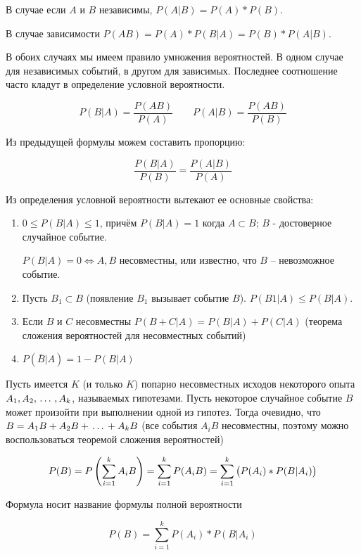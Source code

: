 ﻿\documentclass[a4paper,12pt]{report}
\begin{document}
	В случае если $A$ и $B$ независимы, $P(A|B) = P(A)*P(B)$. 

	В случае зависимости $P(AB) = P(A)*P(B|A) = P(B)*P(A|B)$. 

	В обоих случаях мы имеем правило умножения вероятностей. В одном случае для независимых событий, в другом для зависимых. Последнее соотношение часто кладут в определение условной вероятности. 

	$$
	  P(B|A) = \frac{P(AB)}{P(A)} \qquad 
	  P(A|B) = \frac{P(AB)}{P(B)}
	$$

	Из предыдущей формулы можем составить пропорцию: 
	
	$$
	  \frac{P(B|A)}{P(B)} = \frac{P(A|B)}{P(A)}
	$$

	Из определения условной вероятности вытекают ее основные свойства:


	\begin{enumerate}

	\item	$0 \leqslant P(B|A) \leqslant 1$, причём $P(B|A) = 1$ когда $A \subset B$; $B$ - достоверное случайное событие.

		$P(B|A) = 0 \Longleftrightarrow A, B$ несовместны, или известно, что $B$ – невозможное событие.

	
	\item	Пусть $B_1 \subset B$ (появление $B_1$ вызывает событие $B$). \; $P(B1|A) \leqslant P(B|A)$.


	\item	Если $B$ и $C$ несовместны $P(B+C|A) = P(B|A) + P(C|A)$ (теорема сложения вероятностей для несовместных событий)


	\item	$P(\bar B|A) =  1 - P(B|A)$

	\end{enumerate}


	 Пусть имеется $K$ (и только $K$) попарно несовместных исходов некоторого опыта $A_1,A_2, \,\ldots\, ,A_k$, называемых гипотезами. Пусть некоторое случайное событие $B$ может произойти при выполнении одной из гипотез. Тогда очевидно, что $B = A_1B + A_2B + \,\ldots\, + A_kB$ (все события $A_iB$ несовместны, поэтому можно воспользоваться теоремой сложения вероятностей)

	$$
	  P(B) = P\left(\sum^k_{i=1}A_iB\right)
	       = \sum^k_{i=1}P(A_iB) 
	       = \sum^k_{i=1}\left(P(A_i)*P(B|A_i)\strut\right)
	$$

	Формула носит название формулы полной вероятности 

	$$
	  P(B) = \sum^k_{i=1}P(A_i)*P(B|A_i)
	$$
\end{document}
